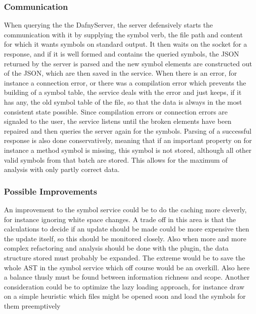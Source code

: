 \subsubsection{Communication}
When querying the the DafnyServer, the server defensively starts the communication with it by supplying the symbol verb, the file path and content for which it wants symbols on standard output. It then waits on the socket for a response, and if it is well formed and contains the queried symbols, the JSON returned by the server is parsed and the new symbol elements are constructed out of the JSON, which are then saved in the service. \newline
When there is an error, for instance a connection error, or there was a compilation error which prevents the building of a symbol table, the service deals with the error and just keeps, if it has any, the old symbol table of the file, so that the data is always in the most consistent state possible. Since compilation errors or connection errors are signaled to the user, the service listens until the broken elements have been repaired and then queries the server again for the symbols. \newline
Parsing of a successful response is also done conservatively, meaning that if an important property on for instance a method symbol is missing, this symbol is not stored, although all other valid symbols from that batch are stored. This allows for the maximum of analysis with only partly correct data.
\subsubsection{Possible Improvements}
An improvement to the symbol service could be to do the caching more cleverly, for instance ignoring white space changes. A trade off in this area is that the calculations to decide if an update should be made could be more expensive then the update itself, so this should be monitored closely. Also when more and more complex refactoring and analysis should be done with the plugin, the data structure stored must probably be expanded. The extreme would be to save the whole AST in the symbol service which off course would be an overkill. Also here a balance thusly must be found between information richness and scope. Another consideration could be to optimize the lazy loading approach, for instance draw on a simple heuristic which files might be opened soon and load the symbols for them preemptively\newline
